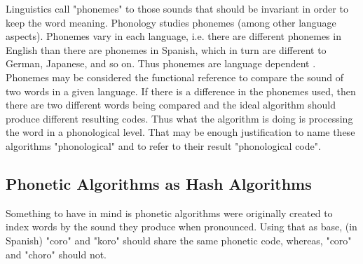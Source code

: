 \documentclass[9pt,conference]{IEEEtran}
\begin{document}
Linguistics call "phonemes" to those sounds that should be invariant in order to keep the word meaning. 
Phonology studies phonemes (among other language aspects). Phonemes vary in each language, 
i.e. there are different phonemes in English than there are phonemes in Spanish, which in turn are 
different to German, Japanese, and so on. Thus phonemes are language dependent
\cite{ref:06,ref:07,ref:18}.\\

Phonemes may be considered the functional reference to compare the sound of two words 
in a given language. If there is a difference in the phonemes used, then there are two 
different words being compared and the ideal algorithm should produce different resulting 
codes. Thus what the algorithm is doing is processing the word in a phonological level. 
That may be enough  justification to name these algorithms "phonological" and to refer to their result
"phonological code". 

\subsection{Phonetic Algorithms as Hash Algorithms}
Something to have in mind is phonetic algorithms were originally created to index words by the sound 
they produce when pronounced\cite{ref:02}. Using that as base, (in Spanish) "coro" and "koro" should
share the same phonetic code, whereas, "coro" and "choro" should not.  \\
\end{document}
